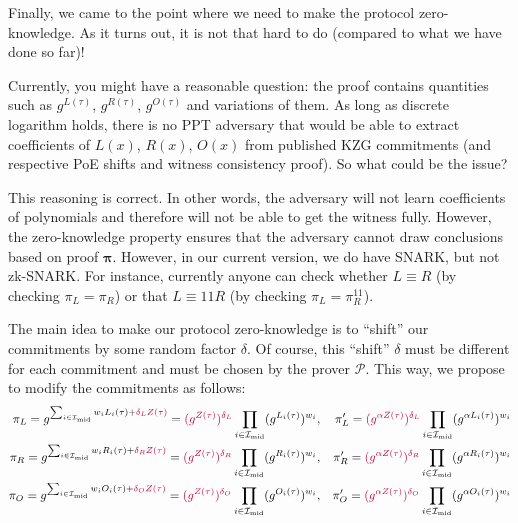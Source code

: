 \documentclass[../lecture-notes.tex]{subfiles}
\begin{document}
Finally, we came to the point where we need to make the protocol zero-knowledge. As it turns out, it is not that hard to do (compared to what we have done so far)!

\begin{remark}
    Currently, you might have a reasonable question: the proof contains quantities such as $g^{L(\tau)}$, $g^{R(\tau)}$, $g^{O(\tau)}$ and variations of them. As long as discrete logarithm holds, there is no PPT adversary that would be able to extract coefficients of $L(x)$, $R(x)$, $O(x)$ from published KZG commitments (and respective PoE shifts and witness consistency proof). So what could be the issue?

    This reasoning is correct. In other words, the adversary will not learn coefficients of polynomials and therefore will not be able to get the witness fully. However, the zero-knowledge property ensures that the adversary cannot draw conclusions based on proof $\boldsymbol{\pi}$. However, in our current version, we do have SNARK, but not zk-SNARK. For instance, currently anyone can check whether $L \equiv R$ (by checking $\pi_L = \pi_R$) or that $L \equiv 11R$ (by checking $\pi_L = \pi_R^{11}$).  
\end{remark}

The main idea to make our protocol zero-knowledge is to ``shift'' our commitments by some random factor $\delta$. Of course, this ``shift'' $\delta$ must be different for each commitment and must be chosen by the prover $\mathcal{P}$. This way, we propose to modify the commitments as follows:
\begin{align*}
    \pi_L = g^{\sum_{i \in \mathcal{I}_{\text{mid}}}w_iL_i(\tau) + \textcolor{purple}{\delta_LZ(\tau)}} = \textcolor{purple}{(g^{Z(\tau)})^{\delta_L}}\prod_{i \in \mathcal{I}_{\text{mid}}}(g^{L_i(\tau)})^{w_i}, && \pi_L' = \textcolor{purple}{(g^{\alpha Z(\tau)})^{\delta_L}}\prod_{i \in \mathcal{I}_{\text{mid}}}(g^{\alpha L_i(\tau)})^{w_i} \\
    \pi_R = g^{\sum_{i \in \mathcal{I}_{\text{mid}}}w_iR_i(\tau) + \textcolor{purple}{\delta_RZ(\tau)}} = \textcolor{purple}{(g^{Z(\tau)})^{\delta_R}}\prod_{i \in \mathcal{I}_{\text{mid}}}(g^{R_i(\tau)})^{w_i}, && \pi_R' = \textcolor{purple}{(g^{\alpha Z(\tau)})^{\delta_R}}\prod_{i \in \mathcal{I}_{\text{mid}}}(g^{\alpha R_i(\tau)})^{w_i} \\
    \pi_O = g^{\sum_{i \in \mathcal{I}_{\text{mid}}}w_iO_i(\tau) + \textcolor{purple}{\delta_OZ(\tau)}} = \textcolor{purple}{(g^{Z(\tau)})^{\delta_O}}\prod_{i \in \mathcal{I}_{\text{mid}}}(g^{O_i(\tau)})^{w_i}, && \pi_O' = \textcolor{purple}{(g^{\alpha Z(\tau)})^{\delta_O}}\prod_{i \in \mathcal{I}_{\text{mid}}}(g^{\alpha O_i(\tau)})^{w_i}
\end{align*}
\end{document}
